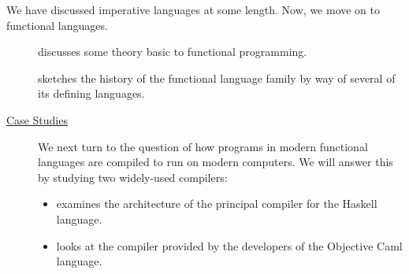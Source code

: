 \label{functional:overview}
We have discussed imperative languages at some length. Now, we move on to functional languages.

\begin{description}
\item[] discusses some theory basic to functional programming.
\item[] sketches the history of the functional language family by way of several of its defining languages.
\item[\href{\#casestudies}{Case Studies}] We next turn to the question of how programs in modern functional languages are compiled to run on modern computers. We will answer this by studying two widely-used compilers:
\begin{itemize}
\item {} examines the architecture of the principal compiler for the Haskell language.
\item {} looks at the compiler provided by the developers of the Objective Caml language.
\end{itemize}
\end{description}